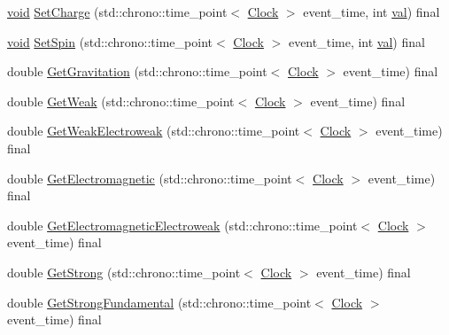 \begin{DoxyCompactItemize}
\item 
\mbox{\hyperlink{glad_8h_a950fc91edb4504f62f1c577bf4727c29}{void}} \mbox{\hyperlink{class_solid_a37503e6b25f912254414e778af2e75cd}{Set\+Charge}} (std\+::chrono\+::time\+\_\+point$<$ \mbox{\hyperlink{universe_8h_a0ef8d951d1ca5ab3cfaf7ab4c7a6fd80}{Clock}} $>$ event\+\_\+time, int \mbox{\hyperlink{glad_8h_a26942fd2ed566ef553eae82d2c109c8f}{val}}) final
\item 
\mbox{\hyperlink{glad_8h_a950fc91edb4504f62f1c577bf4727c29}{void}} \mbox{\hyperlink{class_solid_a615cb8d1ec1376781726bcefa86339cb}{Set\+Spin}} (std\+::chrono\+::time\+\_\+point$<$ \mbox{\hyperlink{universe_8h_a0ef8d951d1ca5ab3cfaf7ab4c7a6fd80}{Clock}} $>$ event\+\_\+time, int \mbox{\hyperlink{glad_8h_a26942fd2ed566ef553eae82d2c109c8f}{val}}) final
\item 
double \mbox{\hyperlink{class_solid_ab5ecb5598be93fe3cd2a21c0cfd363c8}{Get\+Gravitation}} (std\+::chrono\+::time\+\_\+point$<$ \mbox{\hyperlink{universe_8h_a0ef8d951d1ca5ab3cfaf7ab4c7a6fd80}{Clock}} $>$ event\+\_\+time) final
\item 
double \mbox{\hyperlink{class_solid_ac8a7738735a6bda4e89414a2b0c370e1}{Get\+Weak}} (std\+::chrono\+::time\+\_\+point$<$ \mbox{\hyperlink{universe_8h_a0ef8d951d1ca5ab3cfaf7ab4c7a6fd80}{Clock}} $>$ event\+\_\+time) final
\item 
double \mbox{\hyperlink{class_solid_ac98f9c827d58a631627423e25dd611ba}{Get\+Weak\+Electroweak}} (std\+::chrono\+::time\+\_\+point$<$ \mbox{\hyperlink{universe_8h_a0ef8d951d1ca5ab3cfaf7ab4c7a6fd80}{Clock}} $>$ event\+\_\+time) final
\item 
double \mbox{\hyperlink{class_solid_a01cd3c441a4e339927c43536de6d9b5e}{Get\+Electromagnetic}} (std\+::chrono\+::time\+\_\+point$<$ \mbox{\hyperlink{universe_8h_a0ef8d951d1ca5ab3cfaf7ab4c7a6fd80}{Clock}} $>$ event\+\_\+time) final
\item 
double \mbox{\hyperlink{class_solid_aff7ec13bcc584d8330e3f3a1b371bbe6}{Get\+Electromagnetic\+Electroweak}} (std\+::chrono\+::time\+\_\+point$<$ \mbox{\hyperlink{universe_8h_a0ef8d951d1ca5ab3cfaf7ab4c7a6fd80}{Clock}} $>$ event\+\_\+time) final
\item 
double \mbox{\hyperlink{class_solid_ae39d0166456b8feaa39547e5a21c9096}{Get\+Strong}} (std\+::chrono\+::time\+\_\+point$<$ \mbox{\hyperlink{universe_8h_a0ef8d951d1ca5ab3cfaf7ab4c7a6fd80}{Clock}} $>$ event\+\_\+time) final
\item 
double \mbox{\hyperlink{class_solid_ab3a972354b25ad1bbe8c3f3e7638e24c}{Get\+Strong\+Fundamental}} (std\+::chrono\+::time\+\_\+point$<$ \mbox{\hyperlink{universe_8h_a0ef8d951d1ca5ab3cfaf7ab4c7a6fd80}{Clock}} $>$ event\+\_\+time) final

\end{DoxyCompactItemize}
